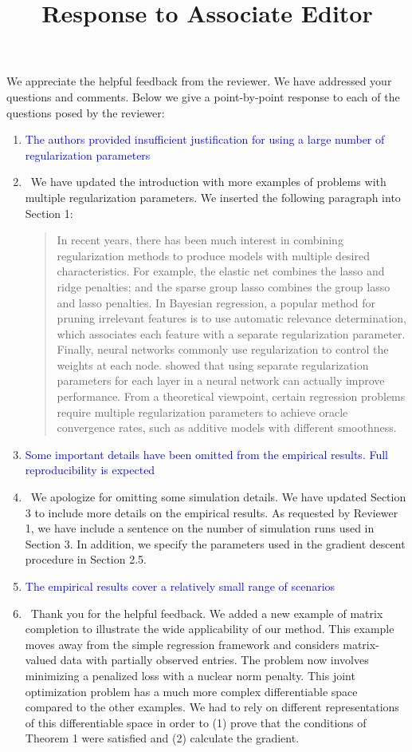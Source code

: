 \documentclass[]{article}
\title{Response to Associate Editor}
\newcommand{\point}[1]{\item \textcolor{blue}{#1}}
\newcommand{\reply}{\item[]\ }
\begin{document}
	\maketitle
		
	We appreciate the helpful feedback from the reviewer. We have addressed your questions and comments. Below we give a point-by-point response to each of the questions posed by the reviewer:
		
	\begin{enumerate}
		\point{The authors provided insufficient justification for using a large number of regularization parameters}
		\reply  We have updated the introduction with more examples of problems with multiple regularization parameters. We inserted the following paragraph into Section 1:
		
		\begin{quote}
			In recent years, there has been much interest in combining regularization methods to produce models with multiple desired characteristics. For example, the elastic net combines the lasso and ridge penalties; and the sparse group lasso  combines the group lasso and lasso penalties. In Bayesian regression, a popular method for pruning irrelevant features is to use automatic relevance determination, which associates each feature with a separate regularization parameter. Finally, neural networks commonly use regularization to control the weights at each node.  showed that using separate regularization parameters for each layer in a neural network can actually improve performance. From a theoretical viewpoint, certain regression problems require multiple regularization parameters to achieve oracle convergence rates, such as additive models with different smoothness.
		\end{quote}
		
		\point{Some important details have been omitted from the empirical results. Full reproducibility is expected}
		
		\reply We apologize for omitting some simulation details. We have updated Section 3 to include more details on the empirical results. As requested by Reviewer 1, we have include a sentence on the number of simulation runs used in Section 3. In addition, we specify the parameters used in the gradient descent procedure in Section 2.5.
		
		\point{The empirical results cover a relatively small range of scenarios}
		
		\reply Thank you for the helpful feedback. We added a new example of matrix completion to illustrate the wide applicability of our method. This example moves away from the simple regression framework and considers matrix-valued data with partially observed entries. The problem now involves minimizing a penalized loss with a nuclear norm penalty. This joint optimization problem has a much more complex differentiable space compared to the other examples. We had to rely on different representations of this differentiable space in order to (1) prove that the conditions of Theorem 1 were satisfied and (2) calculate the gradient.
		

\end{enumerate}
\end{document}
